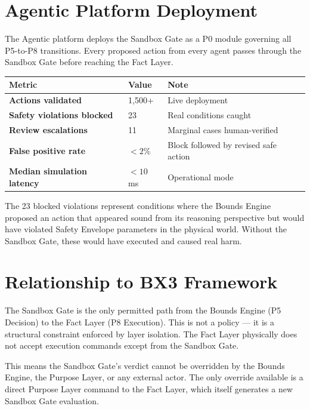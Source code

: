 \documentclass[12pt]{article}
\begin{document}
\section{Agentic Platform Deployment}
\label{sec:deployment}

The Agentic platform deploys the Sandbox Gate as a P0 module governing all P5-to-P8 transitions. Every proposed action from every agent passes through the Sandbox Gate before reaching the Fact Layer.

\begin{center}
\begin{tabular}{>{\bfseries}p{4cm} p{3cm} p{3cm}}
\toprule
\textbf{Metric} & \textbf{Value} & \textbf{Note} \\
\midrule
Actions validated & 1,500+ & Live deployment \\
Safety violations blocked & 23 & Real conditions caught \\
Review escalations & 11 & Marginal cases human-verified \\
False positive rate & $<2\%$ & Block followed by revised safe action \\
Median simulation latency & $<10$\,ms & Operational mode \\
\bottomrule
\end{tabular}
\end{center}

The 23 blocked violations represent conditions where the Bounds Engine proposed an action that appeared sound from its reasoning perspective but would have violated Safety Envelope parameters in the physical world. Without the Sandbox Gate, these would have executed and caused real harm.

\section{Relationship to BX3 Framework}
\label{sec:relationship}

The Sandbox Gate is the only permitted path from the Bounds Engine (P5 Decision) to the Fact Layer (P8 Execution). This is not a policy --- it is a structural constraint enforced by layer isolation. The Fact Layer physically does not accept execution commands except from the Sandbox Gate.

This means the Sandbox Gate's verdict cannot be overridden by the Bounds Engine, the Purpose Layer, or any external actor. The only override available is a direct Purpose Layer command to the Fact Layer, which itself generates a new Sandbox Gate evaluation.
\end{document}
